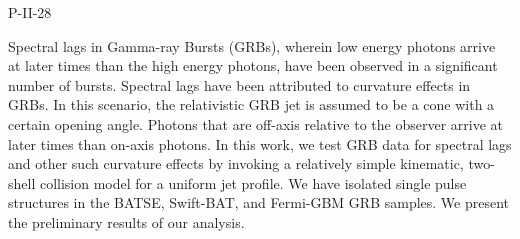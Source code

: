 P-II-28


\bigskip



\bigskip

\noindent Spectral lags in Gamma-ray Bursts (GRBs), wherein low energy photons
arrive at later times than the high energy photons, have been observed
in a significant number of bursts. Spectral lags have been attributed
to curvature effects in GRBs. In this scenario, the relativistic GRB
jet is assumed to be a cone with a certain opening angle. Photons that
are off-axis relative to the observer arrive at later times than
on-axis photons. In this work, we test GRB data for spectral lags and
other such curvature effects by invoking a relatively simple
kinematic, two-shell collision model for a uniform jet profile. We
have isolated single pulse structures in the BATSE, Swift-BAT, and
Fermi-GBM GRB samples.  We present the preliminary results of our
analysis.

